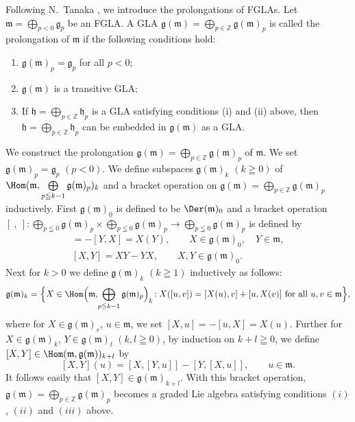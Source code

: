 Following N.~Tanaka \cite{tan70:1}, we introduce the prolongations of FGLAs.
Let $\mathfrak m=\bigoplus\limits_{p<0}\mathfrak g_p$ be an FGLA.
A GLA
$\mathfrak g(\mathfrak m)
=\bigoplus\limits_{p\in\mathbb Z}\mathfrak g(\mathfrak m)_p$ is called the prolongation of $\mathfrak m$ if the following conditions hold:
\begin{enumerate}\itemsep=0pt
\renewcommand{\labelenumi}{$(\roman{enumi})$}
\item $\mathfrak g(\mathfrak m)_p=\mathfrak g_p$ for all $p<0$;
\item $\mathfrak g(\mathfrak m)$ is a transitive GLA;
\item If $\mathfrak h=\bigoplus\limits_{p\in\mathbb Z}\mathfrak h_p$ is a
GLA satisfying conditions (i) and (ii) above, then
$\mathfrak h=\bigoplus\limits_{p\in\mathbb Z}\mathfrak h_p$ can be embedded in
$\mathfrak g(\mathfrak m)$ as a GLA.
\end{enumerate}
We construct the prolongation $\mathfrak g(\mathfrak m)
=\bigoplus\limits_{p\in\mathbb Z}\mathfrak g(\mathfrak m)_p$ of $\mathfrak m$.
We set $\mathfrak g(\mathfrak m)_p=\mathfrak g_p$ $(p<0)$.
We def\/ine subspaces $\mathfrak g(\mathfrak m)_k$ $(k\geqq0)$ of
$\Hom(\mathfrak m,\bigoplus\limits_{p\leqq k-1}\mathfrak g(\mathfrak m)_p)_k$
and a bracket operation on $\mathfrak g(\mathfrak m)
=\bigoplus\limits_{p\in\mathbb Z}\mathfrak g(\mathfrak m)_p$ inductively.
First $\mathfrak g(\mathfrak m)_0$ is def\/ined to be $\Der(\mathfrak m)_0$ and a bracket operation $[\ ,\ ]:\bigoplus\limits_{p\leqq 0}\mathfrak g(\mathfrak m)_p\times \bigoplus\limits_{p\leqq 0}\mathfrak g(\mathfrak m)_p\to
\bigoplus\limits_{p\leqq 0}\mathfrak g(\mathfrak m)_p$ is def\/ined by
\begin{gather*}
[X,Y]=-[Y,X]=X(Y),\qquad  X\in\mathfrak g(\mathfrak m)_0, \quad Y\in\mathfrak m,\\
[X,Y]=XY-YX, \qquad  X,Y\in\mathfrak g(\mathfrak m)_0 .
\end{gather*}
Next for $k>0$ we def\/ine $\mathfrak g(\mathfrak m)_k$ $(k\geqq1)$ inductively
as follows:
\begin{gather*}
\mathfrak g(\mathfrak m)_k
=\Big\{ X\in\Hom\Big(\mathfrak m,\!\bigoplus_{p\leqq k-1}\mathfrak g(\mathfrak m)_p\Big)_k\!:
X([u,v])=[X(u),v]+[u,X(v)]\  \text{for all}\ u,v\in\mathfrak m\Big\},
\end{gather*}
where for $X\in\mathfrak g(\mathfrak m)_r$, $u\in\mathfrak m$,
we set $[X,u]=-[u,X]=X(u)$. Further for $X\in\mathfrak g(\mathfrak m)_k$,
$Y\in\mathfrak g(\mathfrak m)_l$ $(k,l\geqq0)$, by induction on $k+l\geqq0$,
we def\/ine $[X,Y]\in\Hom(\mathfrak m,\mathfrak g(\mathfrak m))_{k+l}$ by
\[
[X,Y](u)=[X,[Y,u]]-[Y,[X,u]],\qquad  u\in \mathfrak m .
\]
It follows easily that $[X,Y]\in \mathfrak g(\mathfrak m)_{k+l}$.
With this bracket operation, $\mathfrak g(\mathfrak m)
=\bigoplus\limits_{p\in\mathbb Z}\mathfrak g(\mathfrak m)_p$ becomes a graded
Lie algebra satisfying conditions $(i)$, $(ii)$ and $(iii)$ above.

